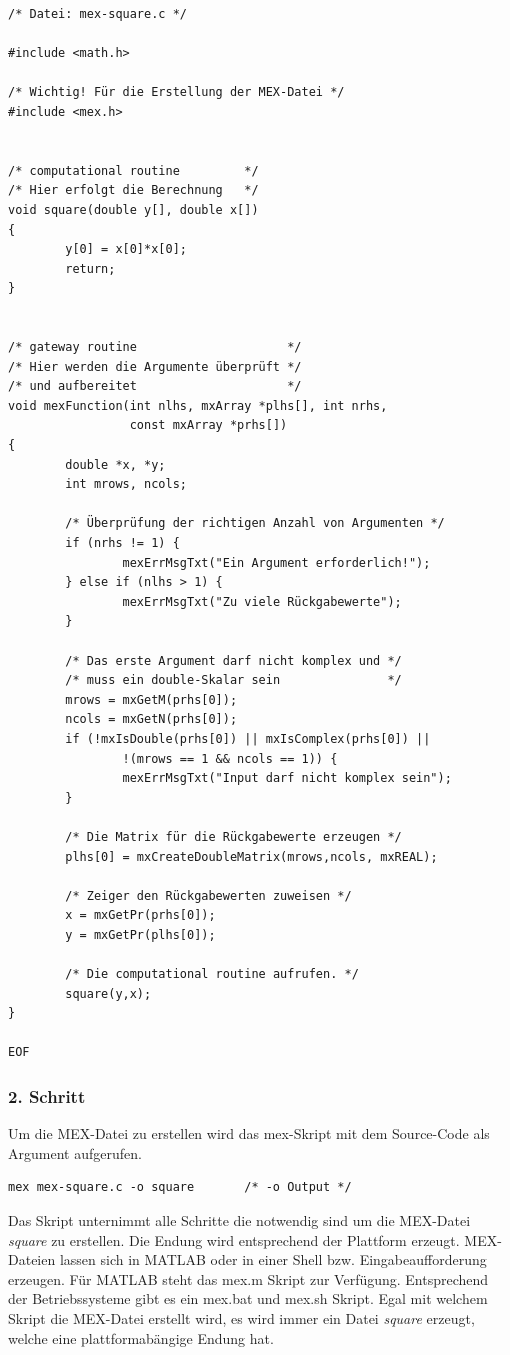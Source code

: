 \documentclass[10pt, bigheadings]{scrartcl}
\begin{document}
\begin{verbatim}
/* Datei: mex-square.c */

#include <math.h>

/* Wichtig! Für die Erstellung der MEX-Datei */
#include <mex.h>


/* computational routine         */
/* Hier erfolgt die Berechnung   */
void square(double y[], double x[])
{
        y[0] = x[0]*x[0];
        return;
}


/* gateway routine                     */
/* Hier werden die Argumente überprüft */
/* und aufbereitet                     */ 
void mexFunction(int nlhs, mxArray *plhs[], int nrhs,
                 const mxArray *prhs[])
{
        double *x, *y;
        int mrows, ncols;

        /* Überprüfung der richtigen Anzahl von Argumenten */
        if (nrhs != 1) {
                mexErrMsgTxt("Ein Argument erforderlich!");
        } else if (nlhs > 1) {
                mexErrMsgTxt("Zu viele Rückgabewerte");
        }

        /* Das erste Argument darf nicht komplex und */
        /* muss ein double-Skalar sein               */
        mrows = mxGetM(prhs[0]);
        ncols = mxGetN(prhs[0]);
        if (!mxIsDouble(prhs[0]) || mxIsComplex(prhs[0]) ||
                !(mrows == 1 && ncols == 1)) {
                mexErrMsgTxt("Input darf nicht komplex sein");
        }

        /* Die Matrix für die Rückgabewerte erzeugen */
        plhs[0] = mxCreateDoubleMatrix(mrows,ncols, mxREAL);

        /* Zeiger den Rückgabewerten zuweisen */
        x = mxGetPr(prhs[0]);
        y = mxGetPr(plhs[0]);

        /* Die computational routine aufrufen. */
        square(y,x);
}

EOF
\end{verbatim}
\subsubsection*{2. Schritt}
Um die MEX-Datei zu erstellen wird das mex-Skript mit dem Source-Code
als Argument aufgerufen.
\begin{verbatim}
mex mex-square.c -o square       /* -o Output */
\end{verbatim}
Das Skript unternimmt alle Schritte die notwendig sind um die MEX-Datei
\textit{square} zu erstellen. Die Endung wird entsprechend der Plattform
erzeugt. MEX-Dateien lassen sich in MATLAB oder in einer Shell bzw.
Eingabeaufforderung erzeugen. Für MATLAB steht das mex.m Skript zur
Verfügung. Entsprechend der Betriebssysteme gibt es ein mex.bat und mex.sh
Skript. Egal mit welchem Skript die MEX-Datei erstellt wird, es
wird immer ein Datei \textit{square} erzeugt, welche eine plattformabängige 
Endung hat.
\end{document}
